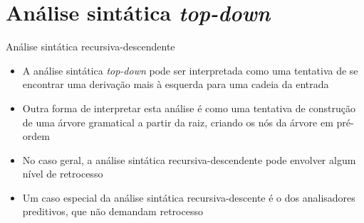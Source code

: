 \section{Análise sintática {\it top-down}}

\begin{frame}[fragile]{Análise sintática recursiva-descendente}

    \begin{itemize}
        \item A análise sintática \textit{top-down} pode ser interpretada como uma tentativa de se encontrar uma derivação mais à esquerda para uma cadeia da
            entrada

        \item Outra forma de interpretar esta análise é como uma tentativa de construção de uma árvore gramatical a partir da raiz, criando os nós da árvore
            em pré-ordem

        \item No caso geral, a análise sintática recursiva-descendente pode envolver algum nível de retrocesso

        \item Um caso especial da análise sintática recursiva-descente é o dos analisadores preditivos, que não demandam retrocesso
    \end{itemize}

\end{frame}

